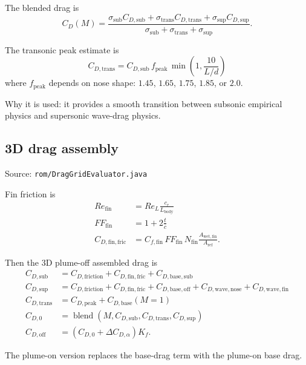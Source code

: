 \documentclass[11pt]{article}
\begin{document}
The blended drag is
\begin{equation*}
C_D(M) = \frac{\sigma_{\mathrm{sub}}C_{D,\mathrm{sub}} + \sigma_{\mathrm{trans}}C_{D,\mathrm{trans}} + \sigma_{\mathrm{sup}}C_{D,\mathrm{sup}}}
{\sigma_{\mathrm{sub}}+\sigma_{\mathrm{trans}}+\sigma_{\mathrm{sup}}}.
\end{equation*}

The transonic peak estimate is
\begin{equation*}
C_{D,\mathrm{trans}} = C_{D,\mathrm{sub}}\,f_{\mathrm{peak}}\,\min\!\left(1,\frac{10}{L/d}\right)
\end{equation*}
where $f_{\mathrm{peak}}$ depends on nose shape: $1.45$, $1.65$, $1.75$, $1.85$, or $2.0$.

Why it is used: it provides a smooth transition between subsonic empirical physics and supersonic wave-drag physics.

\subsection{3D drag assembly}
Source: \texttt{rom/DragGridEvaluator.java}

Fin friction is
\begin{align*}
Re_{\mathrm{fin}} &= Re_L\frac{c_r}{L_{\mathrm{body}}} \\
FF_{\mathrm{fin}} &= 1 + 2\frac{t}{\bar c} \\
C_{D,\mathrm{fin,fric}} &= C_{f,\mathrm{fin}}\,FF_{\mathrm{fin}}\,N_{\mathrm{fin}}\frac{A_{\mathrm{wet,fin}}}{A_{\mathrm{ref}}}.
\end{align*}

Then the 3D plume-off assembled drag is
\begin{align*}
C_{D,\mathrm{sub}} &= C_{D,\mathrm{friction}} + C_{D,\mathrm{fin,fric}} + C_{D,\mathrm{base,sub}} \\
C_{D,\mathrm{sup}} &= C_{D,\mathrm{friction}} + C_{D,\mathrm{fin,fric}} + C_{D,\mathrm{base,off}} + C_{D,\mathrm{wave,nose}} + C_{D,\mathrm{wave,fin}} \\
C_{D,\mathrm{trans}} &= C_{D,\mathrm{peak}} + C_{D,\mathrm{base}}(M=1) \\
C_{D,0} &= \operatorname{blend}(M,C_{D,\mathrm{sub}},C_{D,\mathrm{trans}},C_{D,\mathrm{sup}}) \\
C_{D,\mathrm{off}} &= (C_{D,0} + \Delta C_{D,\alpha})K_f.
\end{align*}

The plume-on version replaces the base-drag term with the plume-on base drag.
\end{document}
